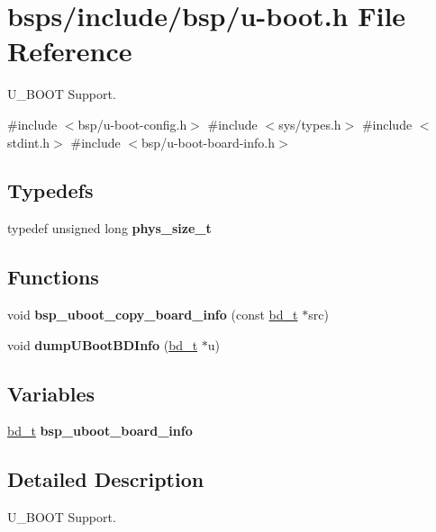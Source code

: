 \hypertarget{u-boot_8h}{}\section{bsps/include/bsp/u-\/boot.h File Reference}
\label{u-boot_8h}


U\+\_\+\+B\+O\+OT Support.  


{\ttfamily \#include $<$bsp/u-\/boot-\/config.\+h$>$}\newline
{\ttfamily \#include $<$sys/types.\+h$>$}\newline
{\ttfamily \#include $<$stdint.\+h$>$}\newline
{\ttfamily \#include $<$bsp/u-\/boot-\/board-\/info.\+h$>$}\newline
\subsection*{Typedefs}
\begin{DoxyCompactItemize}
\item 
\mbox{\label{u-boot_8h_a880f139ea8315745b97139cee92fa881}} 
typedef unsigned long {\bfseries phys\+\_\+size\+\_\+t}
\end{DoxyCompactItemize}
\subsection*{Functions}
\begin{DoxyCompactItemize}
\item 
\mbox{\label{u-boot_8h_a6d0c70f2be8bbc843da353f42696db9d}} 
void {\bfseries bsp\+\_\+uboot\+\_\+copy\+\_\+board\+\_\+info} (const \mbox{\hyperlink{structbd__t}{bd\+\_\+t}} $\ast$src)
\item 
\mbox{\label{u-boot_8h_a23b2d22323503c94b55faa489c94d1d2}} 
void {\bfseries dump\+U\+Boot\+B\+D\+Info} (\mbox{\hyperlink{structbd__t}{bd\+\_\+t}} $\ast$u)
\end{DoxyCompactItemize}
\subsection*{Variables}
\begin{DoxyCompactItemize}
\item 
\mbox{\label{u-boot_8h_a8caebda7ae7a61004e49df6b4d589279}} 
\mbox{\hyperlink{structbd__t}{bd\+\_\+t}} {\bfseries bsp\+\_\+uboot\+\_\+board\+\_\+info}
\end{DoxyCompactItemize}


\subsection{Detailed Description}
U\+\_\+\+B\+O\+OT Support. 

